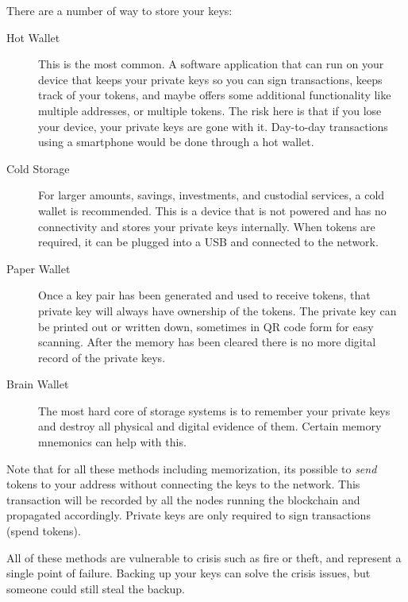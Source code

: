 There are a number of way to store your keys:
\begin{description}
	\item[Hot Wallet] This is the most common. A software application that can run on your device that keeps your private keys so you can sign transactions, keeps track of your tokens, and maybe offers some additional functionality like multiple addresses, or multiple tokens. The risk here is that if you lose your device, your private keys are gone with it. Day-to-day transactions using a smartphone would be done through a hot wallet.
	\item[Cold Storage] For larger amounts, savings, investments, and custodial services, a cold wallet is recommended. This is a device that is not powered and has no connectivity and stores your private keys internally. When tokens are required, it can be plugged into a USB and connected to the network. 
	\item[Paper Wallet] Once a key pair has been generated and used to receive tokens, that private key will always have ownership of the tokens. The private key can be printed out or written down, sometimes in QR code form for easy scanning. After the memory has been cleared there is no more digital record of the private keys.
	\item[Brain Wallet] The most hard core of storage systems is to remember your private keys and destroy all physical and digital evidence of them. Certain memory mnemonics can help with this. 
\end{description}	
Note that for all these methods including memorization, its possible to \textit{send} tokens to your address without connecting the keys to the network. This transaction will be recorded by all the nodes running the blockchain and propagated accordingly. Private keys are only required to sign transactions (spend tokens).

All of these methods are vulnerable to crisis such as fire or theft, and represent a single point of failure. Backing up your keys can solve the crisis issues, but someone could still steal the backup. 

